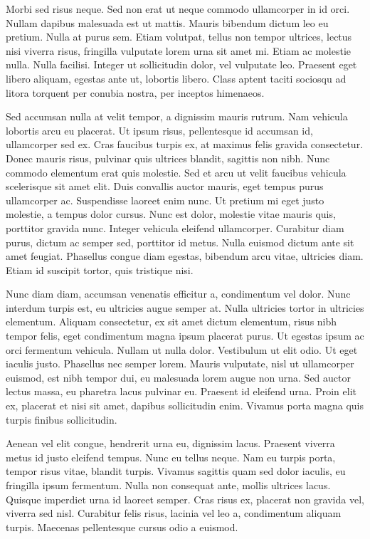 \documentclass[12pt, letterpaper,twocolumn]{article}
\begin{document}
Morbi sed risus neque. Sed non erat ut neque commodo ullamcorper in id orci. Nullam dapibus malesuada est ut mattis. Mauris bibendum dictum leo eu pretium. Nulla at purus sem. Etiam volutpat, tellus non tempor ultrices, lectus nisi viverra risus, fringilla vulputate lorem urna sit amet mi. Etiam ac molestie nulla. Nulla facilisi. Integer ut sollicitudin dolor, vel vulputate leo. Praesent eget libero aliquam, egestas ante ut, lobortis libero. Class aptent taciti sociosqu ad litora torquent per conubia nostra, per inceptos himenaeos.

Sed accumsan nulla at velit tempor, a dignissim mauris rutrum. Nam vehicula lobortis arcu eu placerat. Ut ipsum risus, pellentesque id accumsan id, ullamcorper sed ex. Cras faucibus turpis ex, at maximus felis gravida consectetur. Donec mauris risus, pulvinar quis ultrices blandit, sagittis non nibh. Nunc commodo elementum erat quis molestie. Sed et arcu ut velit faucibus vehicula scelerisque sit amet elit. Duis convallis auctor mauris, eget tempus purus ullamcorper ac. Suspendisse laoreet enim nunc. Ut pretium mi eget justo molestie, a tempus dolor cursus. Nunc est dolor, molestie vitae mauris quis, porttitor gravida nunc. Integer vehicula eleifend ullamcorper. Curabitur diam purus, dictum ac semper sed, porttitor id metus. Nulla euismod dictum ante sit amet feugiat. Phasellus congue diam egestas, bibendum arcu vitae, ultricies diam. Etiam id suscipit tortor, quis tristique nisi.

Nunc diam diam, accumsan venenatis efficitur a, condimentum vel dolor. Nunc interdum turpis est, eu ultricies augue semper at. Nulla ultricies tortor in ultricies elementum. Aliquam consectetur, ex sit amet dictum elementum, risus nibh tempor felis, eget condimentum magna ipsum placerat purus. Ut egestas ipsum ac orci fermentum vehicula. Nullam ut nulla dolor. Vestibulum ut elit odio. Ut eget iaculis justo. Phasellus nec semper lorem. Mauris vulputate, nisl ut ullamcorper euismod, est nibh tempor dui, eu malesuada lorem augue non urna. Sed auctor lectus massa, eu pharetra lacus pulvinar eu. Praesent id eleifend urna. Proin elit ex, placerat et nisi sit amet, dapibus sollicitudin enim. Vivamus porta magna quis turpis finibus sollicitudin.

Aenean vel elit congue, hendrerit urna eu, dignissim lacus. Praesent viverra metus id justo eleifend tempus. Nunc eu tellus neque. Nam eu turpis porta, tempor risus vitae, blandit turpis. Vivamus sagittis quam sed dolor iaculis, eu fringilla ipsum fermentum. Nulla non consequat ante, mollis ultrices lacus. Quisque imperdiet urna id laoreet semper. Cras risus ex, placerat non gravida vel, viverra sed nisl. Curabitur felis risus, lacinia vel leo a, condimentum aliquam turpis. Maecenas pellentesque cursus odio a euismod.
\end{document}
